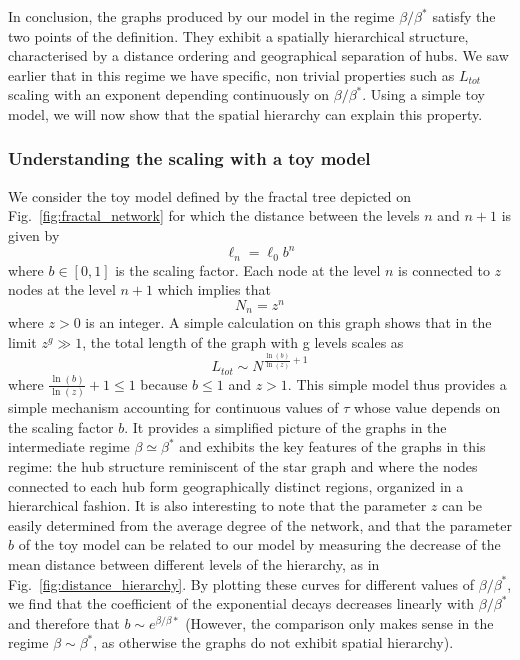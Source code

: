 In conclusion, the graphs produced by our model in the regime $\beta / \beta^*$ satisfy the two points of the definition. They exhibit a spatially hierarchical structure, characterised by a distance ordering and geographical separation of hubs. We saw earlier that in this regime we have specific, non trivial properties such as $L_{tot}$ scaling with an exponent depending continuously on $\beta/\beta^*$. Using a simple toy model, we will now show that the spatial hierarchy can explain this property.


\subsubsection{Understanding the scaling with a toy model} 

We consider the toy model defined by the fractal tree depicted on Fig.~\ref{fig:fractal_network} for which the distance between the levels $n$ and $n+1$ is given by
\begin{equation}
\ell_n=\ell_0 b^n
\label{eq:fractal_distance}
\end{equation}
where $b\in [0,1]$ is the scaling factor. Each node at the level $n$ is connected to $z$ nodes
at the level $n+1$ which implies that
\begin{equation}
N_n = z^n
\label{eq:fractal_nodes}
\end{equation}
where $z>0$ is an integer. A simple calculation on this graph shows that in the limit $z^g \gg 1$, the total length of the graph with g levels scales as
\begin{equation}
L_{tot} \sim N^{\frac{\ln(b)}{\ln(z)}+1}
\end{equation}
where $\frac{\ln(b)}{\ln(z)} +1 \leq 1$ because $b \leq 1$ and $z>1$. This simple model thus provides a simple mechanism accounting for continuous values of $\tau$ whose value depends on the scaling factor $b$. It provides a simplified picture of the graphs in the intermediate regime $\beta \simeq \beta^*$ and exhibits the key features of the graphs in this regime: the hub structure reminiscent of the star graph and where the nodes connected to each hub form geographically distinct regions, organized in a hierarchical fashion. It is also interesting to note that the parameter $z$ can be easily determined from the average degree of the network, and that the parameter $b$ of the toy model can be related to our model by measuring the decrease of the mean distance between different levels of the hierarchy, as in Fig.~\ref{fig:distance_hierarchy}. By plotting these curves for different values of $\beta/\beta^*$, we find that the coefficient of the exponential decays decreases linearly with $\beta / \beta^*$ and therefore that $b \sim e^{\beta/\beta*}$ (However, the comparison only makes sense in the regime $\beta \sim \beta^*$, as otherwise the graphs do not exhibit spatial hierarchy).



